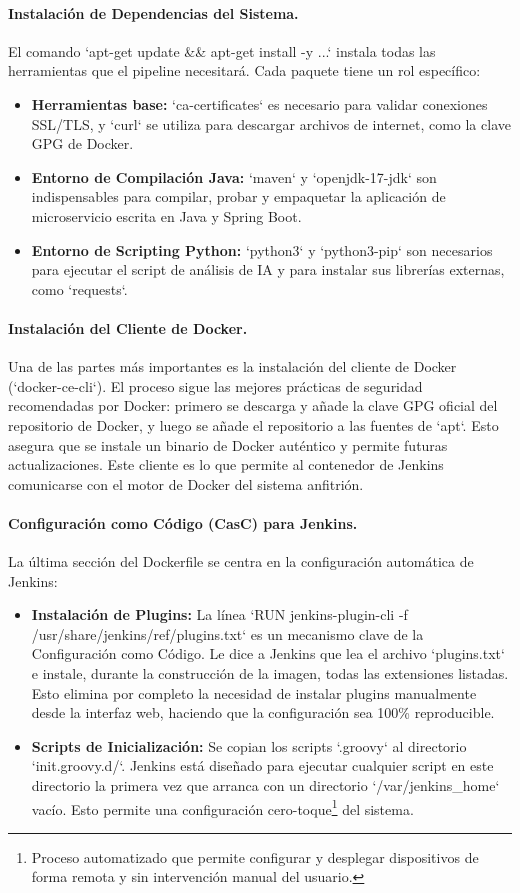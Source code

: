 \paragraph{Instalación de Dependencias del Sistema.}
El comando `apt-get update \&\& apt-get install -y ...` instala todas las herramientas que el pipeline necesitará. Cada paquete tiene un rol específico:
\begin{itemize}
    \item \textbf{Herramientas base:} `ca-certificates` es necesario para validar conexiones SSL/TLS, y `curl` se utiliza para descargar archivos de internet, como la clave GPG de Docker.
    \item \textbf{Entorno de Compilación Java:} `maven` y `openjdk-17-jdk` son indispensables para compilar, probar y empaquetar la aplicación de microservicio escrita en Java y Spring Boot.
    \item \textbf{Entorno de Scripting Python:} `python3` y `python3-pip` son necesarios para ejecutar el script de análisis de IA y para instalar sus librerías externas, como `requests`.
\end{itemize}

\paragraph{Instalación del Cliente de Docker.}
Una de las partes más importantes es la instalación del cliente de Docker (`docker-ce-cli`). El proceso sigue las mejores prácticas de seguridad recomendadas por Docker: primero se descarga y añade la clave GPG oficial del repositorio de Docker, y luego se añade el repositorio a las fuentes de `apt`. Esto asegura que se instale un binario de Docker auténtico y permite futuras actualizaciones. Este cliente es lo que permite al contenedor de Jenkins comunicarse con el motor de Docker del sistema anfitrión.

\paragraph{Configuración como Código (CasC) para Jenkins.}
La última sección del Dockerfile se centra en la configuración automática de Jenkins:
\begin{itemize}
    \item \textbf{Instalación de Plugins:} La línea `RUN jenkins-plugin-cli -f /usr/share/jenkins/ref/plugins.txt` es un mecanismo clave de la Configuración como Código. Le dice a Jenkins que lea el archivo `plugins.txt` e instale, durante la construcción de la imagen, todas las extensiones listadas. Esto elimina por completo la necesidad de instalar plugins manualmente desde la interfaz web, haciendo que la configuración sea 100\% reproducible.
    \item \textbf{Scripts de Inicialización:} Se copian los scripts `.groovy` al directorio `init.groovy.d/`. Jenkins está diseñado para ejecutar cualquier script en este directorio la primera vez que arranca con un directorio `/var/jenkins\_home` vacío. Esto permite una configuración cero-toque\footnote{Proceso automatizado que permite configurar y desplegar dispositivos de forma remota y sin intervención manual del usuario.} del sistema.
\end{itemize}


